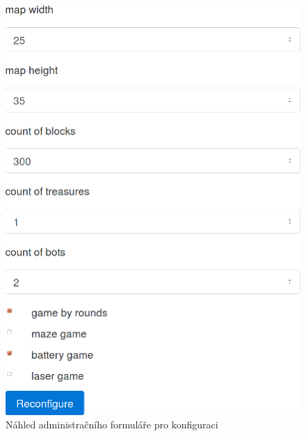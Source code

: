 \begin{figure}[h]
	\centering
	\includegraphics{assets/admin-conf-form}
	\caption{Náhled administračního formuláře pro konfiguraci}
	\label{fig:admin-conf-form}
\end{figure}
